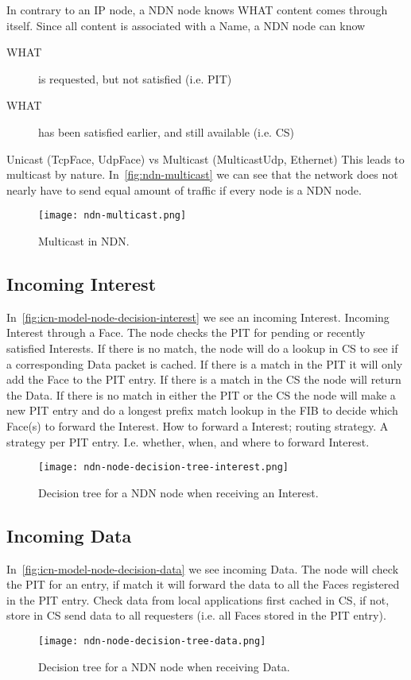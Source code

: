 In contrary to an \gls{IP} node, a \gls{NDN} node knows WHAT content comes through itself. 
Since all content is associated with a Name, a \gls{NDN} node can know 
\begin{description}
  \item[WHAT] is requested, but not satisfied (i.e. \gls{PIT})
  \item[WHAT] has been satisfied earlier, and still available (i.e. \gls{CS})
\end{description}

Unicast (TcpFace, UdpFace) vs Multicast (MulticastUdp, Ethernet)
This leads to multicast by nature.
In~\autoref{fig:ndn-multicast} we can see that the network does not nearly have to send equal amount of traffic if every node is a \gls{NDN} node.
\begin{figure}[H]
  \centering
  \texttt{[image: ndn-multicast.png]}
  \caption{Multicast in NDN.}
  \label{fig:ndn-multicast}
\end{figure}
 
\subsection{Incoming Interest}\label{incoming-interest}
In~\autoref{fig:icn-model-node-decision-interest} we see an incoming Interest.
Incoming Interest through a Face. The node checks the \gls{PIT} for pending or recently satisfied Interests. 
If there is no match, the node will do a lookup in \gls{CS} to see if a corresponding Data packet is cached. 
If there is a match in the \gls{PIT} it will only add the Face to the \gls{PIT} entry. If there is a match in the \gls{CS} the node will return the Data. 
If there is no match in either the \gls{PIT} or the \gls{CS} the node will make a new \gls{PIT} entry and do a longest prefix match lookup in the \gls{FIB} to decide which Face(s) to forward the Interest. 
How to forward a Interest; routing strategy. 
A strategy per \gls{PIT} entry. 
I.e. whether, when, and where to forward Interest.
\begin{figure}[H]
  \centering
  \texttt{[image: ndn-node-decision-tree-interest.png]}
  \caption{Decision tree for a NDN node when receiving an Interest.}
  \label{fig:icn-model-node-decision-interest}
\end{figure}

\subsection{Incoming Data}
In~\autoref{fig:icn-model-node-decision-data} we see incoming Data.
The node will check  the \gls{PIT} for an entry, if match it will forward the data to all the Faces registered in the \gls{PIT} entry.
Check data from local applications first cached in \gls{CS}, if not, store in \gls{CS} send data to all requesters (i.e. all Faces stored in the \gls{PIT} entry).
\begin{figure}[H]
  \centering
  \texttt{[image: ndn-node-decision-tree-data.png]}
  \caption{Decision tree for a NDN node when receiving Data.}
  \label{fig:icn-model-node-decision-data}
\end{figure}



